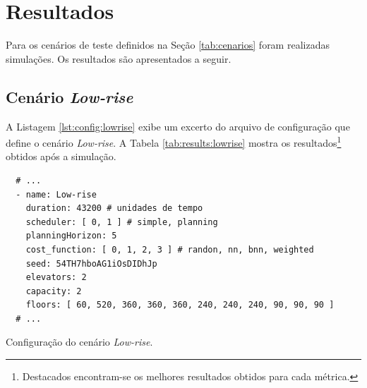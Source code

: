 \chapter{\label{chap:results}Resultados}

Para os cenários de teste definidos na Seção \ref{tab:cenarios} foram realizadas
simulações. Os resultados são apresentados a seguir.

\section{Cenário \textit{Low-rise}}

A Listagem \ref{lst:config:lowrise} exibe um excerto do arquivo de configuração
que define o cenário \textit{Low-rise}. A Tabela \ref{tab:results:lowrise}
mostra os resultados\footnote{Destacados encontram-se os melhores resultados
obtidos para cada métrica.} obtidos após a simulação.

\begin{listing}[htb!]
  \centering
    \begin{verbatim}
  # ...
  - name: Low-rise
    duration: 43200 # unidades de tempo
    scheduler: [ 0, 1 ] # simple, planning
    planningHorizon: 5
    cost_function: [ 0, 1, 2, 3 ] # randon, nn, bnn, weighted
    seed: 54TH7hboAG1iOsDIDhJp
    elevators: 2
    capacity: 2
    floors: [ 60, 520, 360, 360, 360, 240, 240, 240, 90, 90, 90 ]
  # ...
    \end{verbatim}
  \caption{Configuração do cenário \textit{Low-rise}.}
  \label{lst:config:lowrise}
\end{listing}


